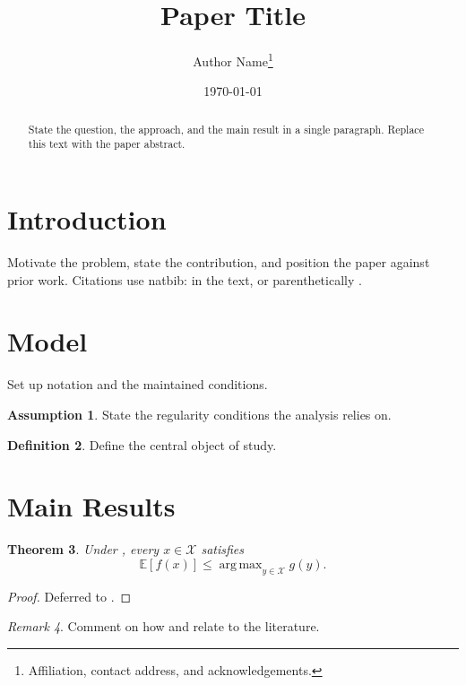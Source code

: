 \documentclass[11pt]{article}
\title{Paper Title}
\author{Author Name\thanks{Affiliation, contact address, and acknowledgements.}}
\date{\today}
\newtheorem{theorem}{Theorem}
\theoremstyle{definition}
\newtheorem{definition}[theorem]{Definition}
\newtheorem{assumption}[theorem]{Assumption}
\theoremstyle{remark}
\newtheorem{remark}[theorem]{Remark}
\newcommand{\E}{\mathbb{E}}
\newcommand{\cX}{\mathcal{X}}
\DeclareMathOperator*{\argmax}{arg\,max}
\begin{document}
\maketitle

\begin{abstract}
State the question, the approach, and the main result in a single paragraph.
Replace this text with the paper abstract.
\end{abstract}

\section{Introduction}
\label{sec:introduction}

Motivate the problem, state the contribution, and position the paper against
prior work. Citations use natbib: \citet{knuth1984} in the text, or
parenthetically \citep{knuth1984}.

\section{Model}
\label{sec:model}

Set up notation and the maintained conditions.

\begin{assumption}
\label{asm:regularity}
State the regularity conditions the analysis relies on.
\end{assumption}

\begin{definition}
\label{def:object}
Define the central object of study.
\end{definition}

\section{Main Results}
\label{sec:results}

\begin{theorem}
\label{thm:main}
Under , every $x \in \cX$ satisfies
\begin{equation}
\label{eq:main}
\E[f(x)] \le \argmax_{y \in \cX} g(y).
\end{equation}
\end{theorem}

\begin{proof}
Deferred to .
\end{proof}

\begin{remark}
Comment on how  and  relate to the literature.
\end{remark}
\end{document}
